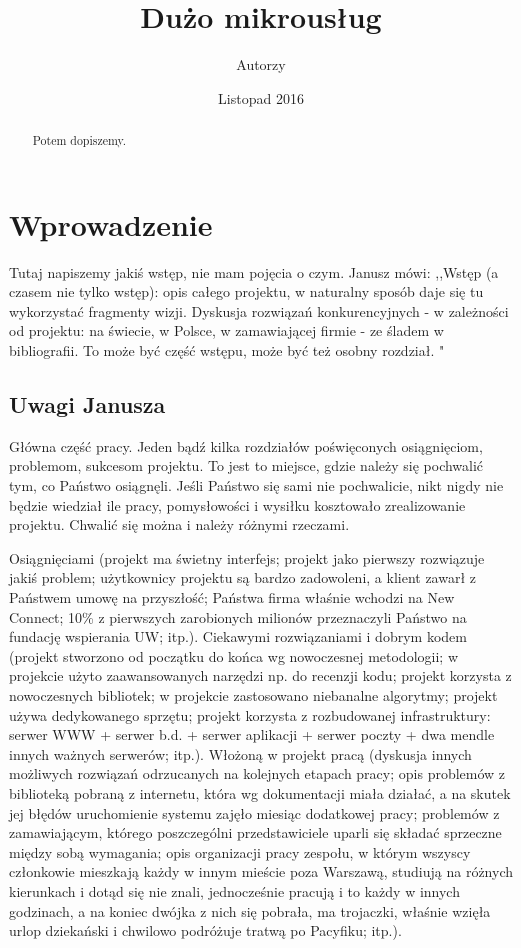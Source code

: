 \documentclass[licencjacka]{pracamgr}
\author{Autorzy}
\title{Dużo mikrousług}
\date{Listopad 2016}
\begin{document}
\maketitle

\begin{abstract}
  Potem dopiszemy.
\end{abstract}

\tableofcontents

\chapter*{Wprowadzenie} 
Tutaj napiszemy jakiś wstęp, nie mam pojęcia o czym. Janusz mówi: ,,Wstęp (a czasem nie tylko wstęp): opis całego projektu, w naturalny sposób daje się tu wykorzystać fragmenty wizji. Dyskusja rozwiązań konkurencyjnych - w zależności od projektu: na świecie, w Polsce, w zamawiającej firmie - ze śladem w bibliografii. To może być część wstępu, może być też osobny rozdział. "

\section{Uwagi Janusza}
Główna część pracy. Jeden bądź kilka rozdziałów poświęconych osiągnięciom, problemom, sukcesom projektu. To jest to miejsce, gdzie należy się pochwalić tym, co Państwo osiągnęli. Jeśli Państwo się sami nie pochwalicie, nikt nigdy nie będzie wiedział ile pracy, pomysłowości i wysiłku kosztowało zrealizowanie projektu. Chwalić się można i należy różnymi rzeczami.

Osiągnięciami (projekt ma świetny interfejs; projekt jako pierwszy rozwiązuje jakiś problem; użytkownicy projektu są bardzo zadowoleni, a klient zawarł z Państwem umowę na przyszłość; Państwa firma właśnie wchodzi na New Connect; 10\% z pierwszych zarobionych milionów przeznaczyli Państwo na fundację wspierania UW; itp.).
Ciekawymi rozwiązaniami i dobrym kodem (projekt stworzono od początku do końca wg nowoczesnej metodologii; w projekcie użyto zaawansowanych narzędzi np. do recenzji kodu; projekt korzysta z nowoczesnych bibliotek; w projekcie zastosowano niebanalne algorytmy; projekt używa dedykowanego sprzętu; projekt korzysta z rozbudowanej infrastruktury: serwer WWW + serwer b.d. + serwer aplikacji + serwer poczty + dwa mendle innych ważnych serwerów; itp.).
Włożoną w projekt pracą (dyskusja innych możliwych rozwiązań odrzucanych na kolejnych etapach pracy; opis problemów z biblioteką pobraną z internetu, która wg dokumentacji miała działać, a na skutek jej błędów uruchomienie systemu zajęło miesiąc dodatkowej pracy; problemów z zamawiającym, którego poszczególni przedstawiciele uparli się składać sprzeczne między sobą wymagania; opis organizacji pracy zespołu, w którym wszyscy członkowie mieszkają każdy w innym mieście poza Warszawą, studiują na różnych kierunkach i dotąd się nie znali, jednocześnie pracują i to każdy w innych godzinach, a na koniec dwójka z nich się pobrała, ma trojaczki, właśnie wzięła urlop dziekański i chwilowo podróżuje tratwą po Pacyfiku; itp.).
\end{document}
